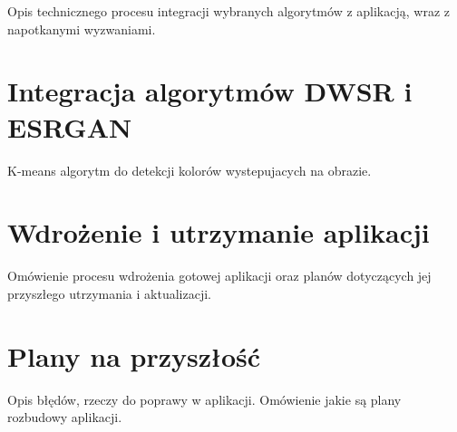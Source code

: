 Opis technicznego procesu integracji wybranych algorytmów z aplikacją, wraz z napotkanymi wyzwaniami.

\section{Integracja algorytmów DWSR i ESRGAN}

K-means algorytm do detekcji kolorów wystepujacych na obrazie.

\section{Wdrożenie i utrzymanie aplikacji}

Omówienie procesu wdrożenia gotowej aplikacji oraz planów dotyczących jej przyszłego utrzymania i aktualizacji.



\section{Plany na przyszłość} \label{sec:plans}

Opis błędów, rzeczy do poprawy w aplikacji. Omówienie jakie są plany rozbudowy aplikacji.